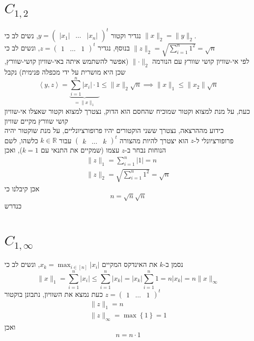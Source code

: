 \documentclass[12pt, titlepage]{article}
\begin{document}
\section*{$C_{1,2}$}
נגדיר וקטור $y=\begin{pmatrix}\left|x_1\right|&\ldots&\left|x_n\right|\end{pmatrix}^t$, נשים לב כי $\lVert x\rVert_2 = \lVert y \rVert_2$.\\
בנוסף, נגדיר $z=\begin{pmatrix}1&\ldots&1\end{pmatrix}^t$, ונשים לב כי $\lVert z\rVert_2 = \sqrt{\sum_{i=1}^n 1^2} = \sqrt{n}$\\
לפי אי-שוויון קושי שוורץ עם הנורמה $\lVert \cdot \rVert_2$ (אפשר להשתמש איתה באי-שוויון קושי-שוורץ, שכן היא מושרית על ידי מכפלה פנימית) נקבל
\[
  \left<y,z\right> = \underbrace{\sum_{i=1}^n \left|x_i\right| \cdot 1}_{=\lVert x\rVert_1} \leq \lVert x\rVert_2 \sqrt{n} \implies \lVert x \rVert_1 \leq \lVert x_2\rVert \sqrt{n}
\]
כעת, על מנת למצוא וקטור שמוכיח שהחסם הוא הדוק, נצטרך למצוא וקטור שאצלו אי-שוויון קושי שוורץ מקיים שוויון\\
כידוע מההרצאה, נצטרך ששני הוקטורים יהיו פרופורציונליים, על מנת שוקטור יהיה פרופורציונלי ל-$z$ הוא יצטרך להיות מהצורה $\begin{pmatrix}k &\ldots& k \end{pmatrix}^t$ עבור $k\in \mathbb{R}$ כלשהו, לשם הנוחות נבחר ב-$z$ עצמו (שמקיים את התנאי עם $k=1$), ואכן
\begin{gather*}
  \lVert z \rVert_1 = \sum_{i=1}^n \left|1\right| = n\\
  \lVert z\rVert_2 = \sqrt{\sum_{i=1}^n 1^2} = \sqrt{n}
\end{gather*}
אכן קיבלנו כי
\[
  n = \sqrt{n}\sqrt{n}
\]
כנדרש
\section*{$C_{1,\infty}$}
נסמן ב-$k$ את האינדקס המקיים $x_k = \max_{i\in\left[n\right]} \left|x_i\right|$, ונשים לב כי
\[
  \lVert x\rVert_1 = \sum_{i=1}^n \left|x_i\right| \leq \sum_{i=1}^n \left|x_k\right|= \left|x_k\right| \sum_{i=1}^n 1 = n\left|x_k\right| = n \lVert x\rVert_\infty
\]
כעת נמצא את השוויון, נתבונן בוקטור $z=\begin{pmatrix}1&\ldots&1\end{pmatrix}^t$
\begin{gather*}
  \lVert z\rVert_1 = n\\
  \lVert z \rVert _\infty = \max\left\{1\right\} = 1
\end{gather*}
ואכן
\[
  n = n \cdot 1
\]
\end{document}
